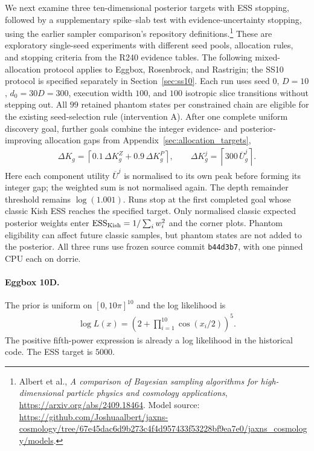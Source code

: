 \documentclass[pdflatex,sn-basic,icol]{sn-jnl}
\theoremstyle{plain}
\theoremstyle{definition}
\begin{document}
We next examine three ten-dimensional posterior targets with ESS stopping, followed by a supplementary spike--slab test with evidence-uncertainty stopping, using the earlier sampler comparison's repository definitions.\footnote{Albert et al., \emph{A comparison of Bayesian sampling algorithms for high-dimensional particle physics and cosmology applications}, \url{https://arxiv.org/abs/2409.18464}. Model source: \url{https://github.com/Joshuaalbert/jaxns-cosmology/tree/67e45dac6d9b273c4f4d957433f53228bf9ea7e0/jaxns_cosmology/models}.}
These are exploratory single-seed experiments with different seed pools, allocation rules, and stopping criteria from the R240 evidence tables. The following mixed-allocation protocol applies to Eggbox, Rosenbrock, and Rastrigin; the SS10 protocol is specified separately in Section~\ref{sec:ss10}.
Each run uses seed $0$, $D=10$, $d_0=30D=300$, execution width $100$, and $100$ isotropic slice transitions without stepping out.
All $99$ retained phantom states per constrained chain are eligible for the existing seed-selection rule (intervention A).
After one complete uniform discovery goal, further goals combine the integer evidence- and posterior-improving allocation gaps from Appendix~\ref{sec:allocation_targets},
\begin{align}
    \Delta K_g=\left\lceil 0.1\,\Delta K^Z_g+0.9\,\Delta K^P_g\right\rceil,
    \qquad
    \Delta K^j_g=\left\lceil 300\,\overline{U}^j_g\right\rceil .
    \label{eq:posterior_candidate_allocation}
\end{align}
Here each component utility $\overline{U}^j$ is normalised to its own peak before forming its integer gap; the weighted sum is not normalised again.
The depth remainder threshold remains $\log(1.001)$.
Runs stop at the first completed goal whose classic Kish ESS reaches the specified target.
Only normalised classic expected posterior weights enter $\mathrm{ESS}_{\rm Kish}=1/\sum_i w_i^2$ and the corner plots.
Phantom eligibility can affect future classic samples, but phantom states are not added to the posterior.
All three runs use frozen source commit \texttt{b44d3b7}, with one pinned CPU each on dorrie.

\paragraph{Eggbox 10D.}
The prior is uniform on $[0,10\pi]^{10}$ and the log likelihood is
\begin{align}
    \log L(x)=\left(2+\prod_{i=1}^{10}\cos(x_i/2)\right)^5.
\end{align}
The positive fifth-power expression is already a log likelihood in the historical code.
The ESS target is $5000$.
\end{document}
